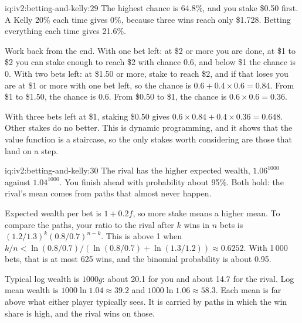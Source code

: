 \begin{solution}{iq:iv2:betting-and-kelly:29}
The highest chance is 64.8\%, and you stake \$0.50 first. A Kelly 20\% each time gives 0\%, because three wins reach only \$1.728. Betting everything each time gives 21.6\%.

Work back from the end. With one bet left: at \$2 or more you are done, at \$1 to \$2 you can stake enough to reach \$2 with chance 0.6, and below \$1 the chance is 0. With two bets left: at \$1.50 or more, stake to reach \$2, and if that loses you are at \$1 or more with one bet left, so the chance is $0.6 + 0.4 \times 0.6 = 0.84$. From \$1 to \$1.50, the chance is 0.6. From \$0.50 to \$1, the chance is $0.6 \times 0.6 = 0.36$.

With three bets left at \$1, staking \$0.50 gives $0.6 \times 0.84 + 0.4 \times 0.36 = 0.648$. Other stakes do no better. This is dynamic programming, and it shows that the value function is a staircase, so the only stakes worth considering are those that land on a step.

\end{solution}

\begin{solution}{iq:iv2:betting-and-kelly:30}
The rival has the higher expected wealth, $1.06^{1000}$ against $1.04^{1000}$. You finish ahead with probability about 95\%. Both hold: the rival's mean comes from paths that almost never happen.

Expected wealth per bet is $1 + 0.2f$, so more stake means a higher mean. To compare the paths, your ratio to the rival after $k$ wins in $n$ bets is $(1.2/1.3)^k(0.8/0.7)^{n - k}$. This is above 1 when $k/n < \ln(0.8/0.7)/\left(\ln(0.8/0.7) + \ln(1.3/1.2)\right) \approx 0.6252$. With 1\,000 bets, that is at most 625 wins, and the binomial probability is about 0.95.

Typical log wealth is $1000g$: about 20.1 for you and about 14.7 for the rival. Log mean wealth is $1000\ln 1.04 \approx 39.2$ and $1000\ln 1.06 \approx 58.3$. Each mean is far above what either player typically sees. It is carried by paths in which the win share is high, and the rival wins on those.

\end{solution}

